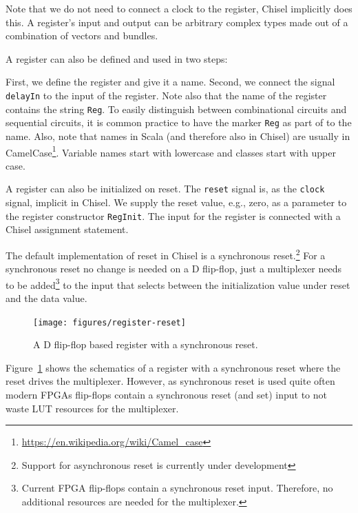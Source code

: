 \documentclass[%
    10pt,
    headinclude, footexclude,
    openright, %
    notitlepage,
    cleardoubleempty,
    headsepline,
    pointlessnumbers,
    bibtotoc, idxtotoc,
    ]{scrbook}
\newcommand{\code}[1]{{\small{\texttt{#1}}}}
\newcommand{\myref}[2]{\href{#1}{#2}}
\renewcommand{\myref}[2]{{#2}{\footnote{\url{#1}}}}
\begin{document}
\noindent Note that we do not need to connect a clock to the register, Chisel implicitly does this.
A register's input and output can be arbitrary complex types
made out of a combination of vectors and bundles.

A register can also be defined and used in two steps:


First, we define the register and give it a name. Second, we connect the signal
\code{delayIn} to the input of the register. Note also that the name of the register
contains the string \code{Reg}. To easily distinguish between combinational
circuits and sequential circuits, it is common practice to have the marker
\code{Reg} as part of to the name. Also, note that names in Scala (and therefore
also in Chisel) are usually in
\myref{https://en.wikipedia.org/wiki/Camel_case}{CamelCase}.
Variable names start with lowercase and classes start with upper case.

A register can also be initialized on reset. The \code{reset} signal is, as the \code{clock} signal,
implicit in Chisel. We supply the reset value, e.g., zero, as a parameter to the register
constructor \code{RegInit}. The input for the register is connected with a Chisel
assignment statement.


The default implementation of reset in Chisel is a synchronous
reset.\footnote{Support for asynchronous reset is currently under development}
For a synchronous reset no change is needed on a D flip-flop, just a multiplexer
needs to be added\footnote{Current FPGA flip-flops contain a synchronous reset input.
Therefore, no additional resources are needed for the multiplexer.} to the input that
selects between the initialization value under reset and the data value.


\begin{figure}
  \centering
  \texttt{[image: figures/register-reset]}
  \caption{A D flip-flop based register with a synchronous reset.}
  \label{fig:register-reset}
\end{figure}

Figure~\ref{fig:register-reset} shows the schematics of a register with a synchronous reset
where the reset drives the multiplexer. However, as synchronous reset is used quite often
modern FPGAs flip-flops contain a synchronous reset (and set) input to not waste LUT
resources for the multiplexer.
\end{document}
